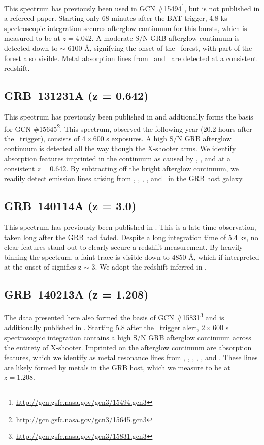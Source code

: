 \documentclass{aa}    %
\begin{document}
This spectrum has previously been used in GCN
\#15494\footnote{\url{http://gcn.gsfc.nasa.gov/gcn3/15494.gcn3}}, but is not
published in a refereed paper. Starting only 68 minutes after the BAT trigger,
4.8 ks spectroscopic integration secures afterglow continuum for this bursts,
which is measured to be at $z = 4.042$. A moderate S/N GRB afterglow continuum
is detected down to $\sim$ 6100 \AA, signifying the onset of the \lya~forest,
with part of the forest also visible. Metal absorption lines from \SIii~and
\SIiv~are detected at a consistent redshift.

\subsection{GRB~131231A (z = 0.642)}	

This spectrum has previously been published in \citet{Kruhler2015} and
addtionally forms the basis for GCN
\#15645\footnote{\url{http://gcn.gsfc.nasa.gov/gcn3/15645.gcn3}}. This spectrum,
observed the following year (20.2 hours after the \swift~trigger), consists of
$4\times600$ s exposures. A high S/N GRB afterglow continuum is detected all the
way though the X-shooter arms. We identify absorption features imprinted in the
continuum as caused by \feii, \mgii, and \cahk at a consistent $z = 0.642$. By
subtracting off the bright afterglow continuum, we readily detect emission lines
arising from \oii, \hg, \hb, \oiii, and \ha~in the GRB host galaxy.

\subsection{GRB~140114A (z = 3.0)}	

This spectrum has previously been published in \citet{Kruhler2015}. This is a
late time observation, taken long after the GRB had faded. Despite a long
integration time of 5.4 ks, no clear features stand out to clearly secure a
redshift measurement. By heavily binning the spectrum, a faint trace is visible
down to 4850 \AA, which if interpreted at the onset of \lya signifies z $\sim$
3. We adopt the redshift inferred in \citet{Kruhler2015}.

\subsection{GRB~140213A (z = 1.208)}	

The data presented here also formed the basis of GCN
\#15831\footnote{\url{http://gcn.gsfc.nasa.gov/gcn3/15831.gcn3}} and is
additionally published in \citet{Kruhler2015}. Starting 5.8 after the
\swift~trigger alert, $2\times600$ s spectroscopic integration contains a high
S/N GRB afterglow continuum across the entirety of X-shooter. Imprinted on the
afterglow continuum are absorption features, which we identify as metal
resonance lines from \civ, \alii, \aliii, \feii, \mgii, and \mgi. These lines
are likely formed by metals in the GRB host, which we measure to be at $z =
1.208$.
\end{document}
